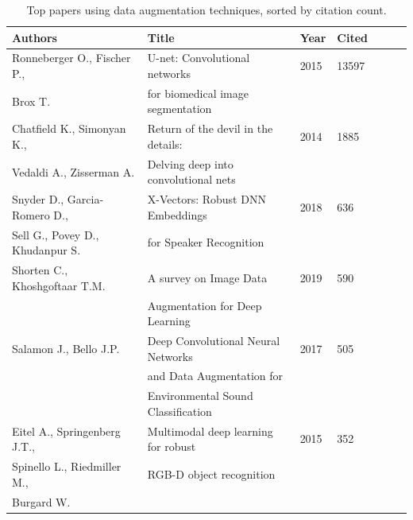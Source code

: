 \documentclass[parskip=full]{scrartcl}
\begin{document}
\begin{table}[ht]
    \begin{center}
    \caption{\label{tab:top_papers}
        Top papers using data augmentation techniques, sorted by citation
        count.
    }
    \begin{tabular*}{\textwidth}{@{\extracolsep{\fill}}lllllll@{\extracolsep{\fill}}}
        \toprule
        Authors & Title & Year & Cited \\
        \midrule
        Ronneberger O., Fischer P., & U-net: Convolutional networks & 2015 & 13597 \\
        \vspace{.2cm}Brox T. & for biomedical image segmentation && \\

        Chatfield K., Simonyan K., & Return of the devil in the details: & 2014 & 1885 \\
        \vspace{.2cm}Vedaldi A., Zisserman A. & Delving deep into convolutional nets && \\

        Snyder D., Garcia-Romero D., & X-Vectors: Robust DNN Embeddings & 2018 & 636 \\
        \vspace{.2cm}Sell G., Povey D., Khudanpur S. & for Speaker Recognition && \\

        Shorten C., Khoshgoftaar T.M. & A survey on Image Data & 2019 & 590 \\
        \vspace{.2cm}                 & Augmentation for Deep Learning && \\

        Salamon J., Bello J.P. & Deep Convolutional Neural Networks & 2017 & 505 \\
                               & and Data Augmentation for \\
        \vspace{.2cm}          & Environmental Sound Classification \\

        Eitel A., Springenberg J.T., & Multimodal deep learning for robust & 2015 & 352 \\
        Spinello L., Riedmiller M., & RGB-D object recognition && \\
        \vspace{.2cm}Burgard W. &&& \\


\end{tabular*}
\end{center}
\end{table}
\end{document}
